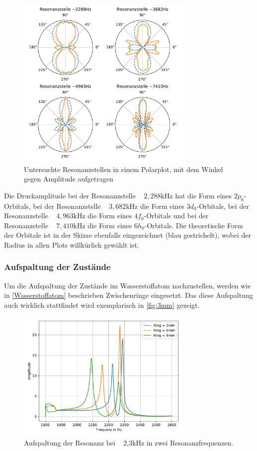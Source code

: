 \begin{figure}
    \centering
    \includegraphics[width=0.75\textwidth]{pic/all.pdf}
    \caption{Untersuchte Resonanzstellen in einem Polarplot, mit dem Winkel gegen Amplitude aufgetragen}
    \label{fig:4}
  \end{figure}

\noindent
Die Druckamplitude bei der Resonanzstelle ~ $2,288$kHz hat die Form eines $2{p}_0$-Orbitals, bei der Resonanzstelle ~ $3,682$kHz die Form eines $3{d}_0$-Orbitals,
bei der Resonanzstelle ~ $4,963$kHz die Form eines $4{f}_0$-Orbitals und bei der Resonanzstelle ~ $7,410$kHz die Form eines $6{h}_0$-Orbitals. Die theoretische Form
der Orbitale ist in der Skizze ebenfalls eingezeichnet (blau gestrichelt), wobei der Radius in allen Plots willkürlich gewählt ist.


\subsubsection{Aufspaltung der Zustände}
Um die Aufspaltung der Zustände im Wasserstoffatom nachzustellen, werden wie in \autoref{Wasserstoffatom} beschrieben Zwischenringe eingesetzt. Das diese Aufspaltung 
auch wirklich stattfindet wird exemplarisch in \autoref{fig:3mm} gezeigt.

\begin{figure}
    \centering
    \includegraphics[width=0.75\textwidth]{pic/3mm.pdf}
    \caption{Aufspaltung der Resonanz bei ~ 2,3kHz in zwei Resonanzfrequenzen.}
    \label{fig:3mm}
  \end{figure}


